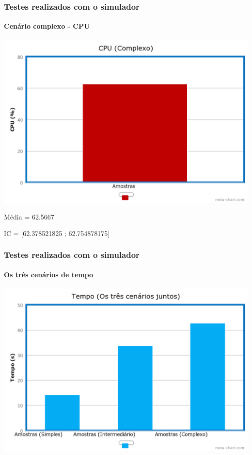 \documentclass{beamer}
\begin{document}
\begin{frame}
	\frametitle{Testes realizados com o simulador}
	\framesubtitle{Cenário complexo - CPU}
	\begin{center}
	\includegraphics[scale=0.18]{chart(5).png}
	\end{center}
	\begin{center}
	Média = 62.5667
	\end{center}
	\begin{center}
	IC = [62.378521825 ; 62.754878175]
	\end{center}
\end{frame}

\begin{frame}
	\frametitle{Testes realizados com o simulador}
	\framesubtitle{Os três cenários de tempo}
	\begin{center}
	\includegraphics[scale=0.18]{chart(6).png}
	\end{center}
\end{frame}
\end{document}
